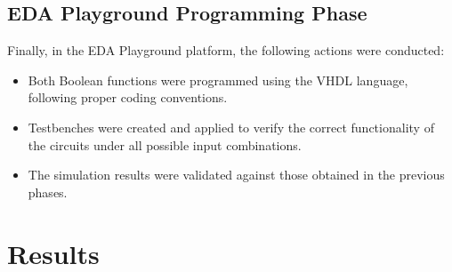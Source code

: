 \documentclass[12pt]{article}  %
\begin{document}
\subsection{EDA Playground Programming Phase}
Finally, in the EDA Playground platform, the following actions were conducted:
\begin{itemize}
    \item Both Boolean functions were programmed using the VHDL language, following proper coding conventions.
    \item Testbenches were created and applied to verify the correct functionality of the circuits under all possible input combinations.
    \item The simulation results were validated against those obtained in the previous phases.
\end{itemize}

\section{Results} %
\end{document}

